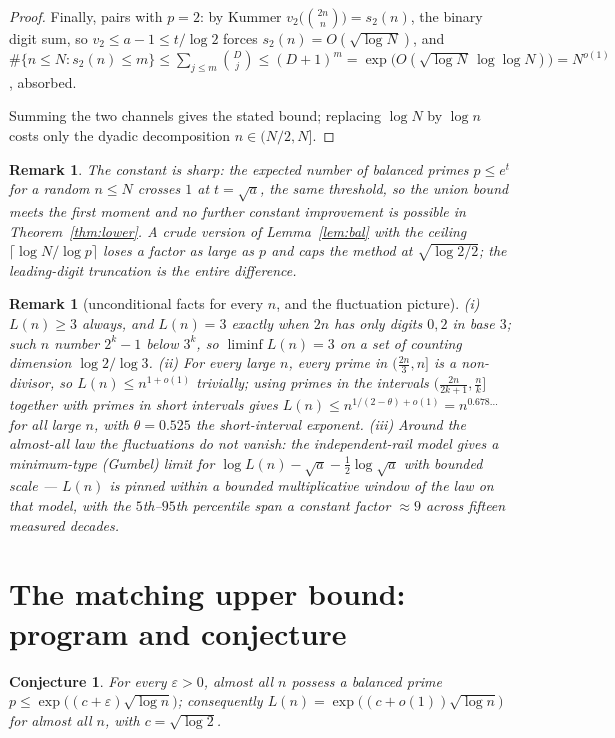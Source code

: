 \documentclass[11pt]{article}
\newtheorem{conjecture}[theorem]{Conjecture}
\newtheorem{remark}[theorem]{Remark}
\newcommand{\eps}{\varepsilon}
\begin{document}
\begin{proof}
Finally, pairs with $p=2$: by Kummer $v_2\bigl(\binom{2n}n\bigr)=s_2(n)$, the
binary digit sum, so $v_2\le a-1\le t/\log2$ forces
$s_2(n)=O(\sqrt{\log N})$, and
$\#\{n\le N:s_2(n)\le m\}\le\sum_{j\le m}\binom Dj\le(D+1)^{m}
=\exp\bigl(O(\sqrt{\log N}\,\log\log N)\bigr)=N^{o(1)}$, absorbed.

Summing the two channels gives the stated bound; replacing $\log N$ by
$\log n$ costs only the dyadic decomposition $n\in(N/2,N]$.
\end{proof}

\begin{remark}
The constant is sharp: the expected number of balanced primes
$p\le e^{t}$ for a random $n\le N$ crosses $1$ at $t=\sqrt{a}$, the same
threshold, so the union bound meets the first moment and no further constant
improvement is possible in Theorem~\ref{thm:lower}.  A crude version of
Lemma~\ref{lem:bal} with the ceiling $\lceil\log N/\log p\rceil$ loses a
factor as large as $p$ and caps the method at $\sqrt{\log2/2}$; the
leading-digit truncation is the entire difference.
\end{remark}

\begin{remark}[unconditional facts for every $n$, and the fluctuation
picture]
(i) $L(n)\ge3$ always, and $L(n)=3$ exactly when $2n$ has only digits
$0,2$ in base $3$; such $n$ number $2^{k}-1$ below $3^{k}$, so
$\liminf L(n)=3$ on a set of counting dimension $\log2/\log3$.
(ii) For every large $n$, every prime in $(\tfrac{2n}3,n]$ is a
non-divisor, so $L(n)\le n^{1+o(1)}$ trivially; using primes in the
intervals $(\tfrac{2n}{2k+1},\tfrac nk]$ together with primes in short
intervals \cite{BHP} gives $L(n)\le n^{1/(2-\theta)+o(1)}=n^{0.678\dots}$
for all large $n$, with $\theta=0.525$ the short-interval exponent.
(iii) Around the almost-all law the fluctuations do not vanish: the
independent-rail model gives a minimum-type (Gumbel) limit for
$\log L(n)-\sqrt{a}-\tfrac12\log\sqrt a$ with bounded scale --- $L(n)$ is
pinned within a bounded multiplicative window of the law on that model, with
the $5$th--$95$th percentile span a constant factor $\approx9$ across
fifteen measured decades.
\end{remark}

\section{The matching upper bound: program and conjecture}

\begin{conjecture}\label{conj:upper}
For every $\eps>0$, almost all $n$ possess a balanced prime
$p\le\exp\bigl((c+\eps)\sqrt{\log n}\bigr)$; consequently
$L(n)=\exp\bigl((c+o(1))\sqrt{\log n}\bigr)$ for almost all $n$,
with $c=\sqrt{\log2}$.
\end{conjecture}
\end{document}
